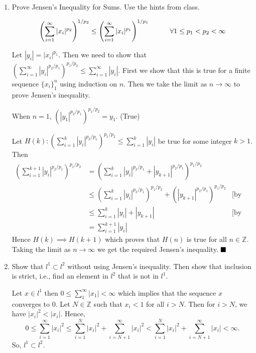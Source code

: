 \documentclass[12pt]{article}
\newcommand{\qed}{$\hfill\blacksquare$}
\begin{document}
\begin{enumerate}
\begin{mybox}
  \end{mybox}
  
  \item Prove Jensen's Inequality for Sums. Use the hints from class. 
  \begin{mybox}
    
    $$\left(\sum_{i=1}^{\infty}{|x_i|^{p_2}}\right)^{1/{p_2}}
    \leq\left(\sum_{i=1}^{\infty}{|x_i|^{p_1}}\right)^
    {1/{p_1}}\hspace*{10mm}\forall 1\leq p_1<p_2<\infty$$
  
    
    Let $|y_i|=|x_i|^{p_1}$. Then we need to show that
    $\left(\sum_{i=1}^{\infty}{|y_i|^{p_2/p_1}}\right)
    ^{{p_1/p_2}}
    \leq\sum_{i=1}^{\infty}{|y_i|}$. First we show that
    this is true for a finite sequence $\{x_i\}_1^{n}$
    using induction on $n$. Then we take the limit as
    $n\to \infty$ to prove Jensen's inequality.

    \setlength{\parskip}{3mm}
    When $n=1$, $(|y_1|^{p_2/p_1})^{p_1/p_2}=y_1$.
    (True)

    \setlength{\parskip}{3mm}
    Let $H(k):\left(\sum_{i=1}^{k}{|y_i|^{p_2/p_1}}\right)^{p_1/{p_2}}
    \leq\sum_{i=1}^{k}{|y_i|}$ be true for some integer
    $k>1$. Then
    \begin{align*}
      \left(\sum_{i=1}^{k+1}{|y_i|^{p_2/p_1}}\right)^{p_1/{p_2}}
      &=\left(\sum_{i=1}^{k}{|y_i|^{p_2/p_1}}
      +|y_{k+1}|^{p_2/p_1}\right)^{p_1/{p_2}}&\\
      &\leq \left(\sum_{i=1}^{k}{|y_i|^{p_2/p_1}}\right)
      ^{p_1/p_2}
      +\left(|y_{k+1}|^{p_2/p_1}\right)^{p_1/{p_2}}
      &\text{[by Minkowski inequality]}\\
      &\leq \sum_{i=1}^{k}{|y_i|}+|y_{k+1}|
      &\text{[by induction hypothesis]}\\
      &=\sum_{i=1}^{k+1}{|y_i|}
    \end{align*}
    Hence $H(k)\implies H(k+1)$ which proves that $H(n)$ is
    true for all $n\in \mathbb{Z}$. Taking the limit
    as $n\to\infty$ we get the required Jensen's inequality.
  \qed
\end{mybox}
  \item Show that $l^1 \subset l^2$ without using Jensen's inequality. Then show that inclusion is strict, i.e., find an element in $l^2$ that is not in $l^1$. 
  \begin{mybox}

    Let $x\in l^1$ then $0\leq\sum_1^\infty{|x_1|}<\infty$
    which implies that the sequence $x$ converges to $0$. Let $N\in\mathbb{Z}$
    such that $x_i<1$ for all $i>N$. Then for $i>N$, we have
    $|x_i|^2<|x_i|$. Hence,
    $$0\leq \sum_{i=1}^{\infty}{|x_i|^2}
    \leq \sum_{i=1}^{N}{|x_i|^2}+
    \sum_{i=N+1}^{\infty}{|x_i|^2}<\sum_{i=1}^{N}{|x_i|^2}+
    \sum_{i=N+1}^{\infty}{|x_i|}<\infty.$$
    So, $l^1\subset l^2$.


\end{mybox}
\end{enumerate}
\end{document}
